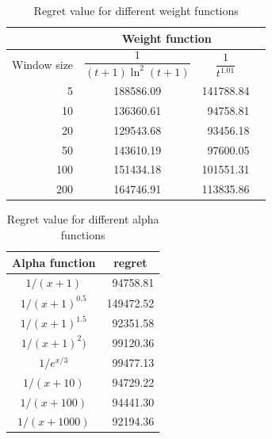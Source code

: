 \documentclass[12pt, twoside]{article}
\begin{document}
\begin{table}[h]

\centering

\begin{tabular}{r|ccc}
 &
\multicolumn{2}{c}{Weight function} \\

\toprule {Window size}  &
\centering $\dfrac{1}{(t+1)\ln^2(t+1)}$ &
\centering $\dfrac1{t^{1.01}}$  & \tabularnewline
\midrule
5 &  188586.09 & 141788.84 \\ %
10 &  136360.61 &\ 94758.81 \\ %
20 &  129543.68 &\ 93456.18 \\ %
50 &  143610.19 &\ 97600.05 \\ %
100 & 151434.18 & 101551.31 \\ %
200 & 164746.91 & 113835.86 \\ %
\bottomrule
\end{tabular}
\caption{Regret value for different weight functions} \hspace{16cm}
\end{table}


\begin{table}[h]

\centering

\begin{tabular}{cc}
\toprule
Alpha function & regret \\
\midrule
$1 / (x + 1)$ &\ 94758.81 \\
$1 / (x + 1)^{0.5}$ & 149472.52 \\
$1 / (x + 1)^{1.5}$ &\ 92351.58 \\
$1 / (x + 1)^2)$ &\ 99120.36 \\
$1 / e^{x/3}$ &\ 99477.13 \\
$1 / (x + 10)$ &\ 94729.22 \\
$1 / (x + 100)$ &\ 94441.30 \\
$1 / (x + 1000)$ &\ 92194.36 \\
\bottomrule
\end{tabular}

\caption{Regret value for different alpha functions} \hspace{16cm}
\end{table}
\end{document}
